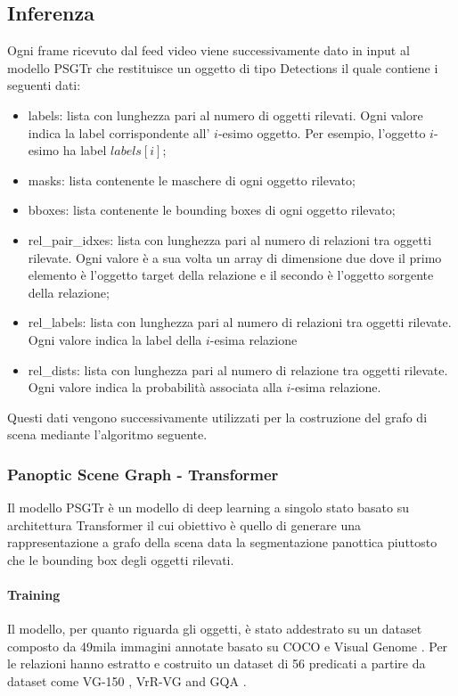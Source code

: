 \subsection{Inferenza}
Ogni frame ricevuto dal feed video viene successivamente dato in input al modello PSGTr \cite{yang2022psg} che restituisce un oggetto di tipo Detections il quale contiene i seguenti dati:
\begin{itemize}
  \item labels: lista con lunghezza pari al numero di oggetti rilevati. Ogni valore indica la label corrispondente all' $i$-esimo oggetto. Per esempio, l'oggetto $i$-esimo ha label $labels[i]$;
  \item masks: lista contenente le maschere di ogni oggetto rilevato;
  \item bboxes: lista contenente le bounding boxes di ogni oggetto rilevato;
  \item rel\_pair\_idxes: lista con lunghezza pari al numero di relazioni tra oggetti rilevate. Ogni valore è a sua volta un array di dimensione due dove il primo elemento è l'oggetto target della relazione e il secondo è l'oggetto sorgente della relazione;
  \item rel\_labels: lista con lunghezza pari al numero di relazioni tra oggetti rilevate. Ogni valore indica la label della $i$-esima relazione
  \item rel\_dists: lista con lunghezza pari al numero di relazione tra oggetti rilevate. Ogni valore indica la probabilità associata alla $i$-esima relazione.
\end{itemize}
Questi dati vengono successivamente utilizzati per la costruzione del grafo di scena mediante l'algoritmo seguente.

\subsubsection{Panoptic Scene Graph - Transformer}
Il modello PSGTr \cite{yang2022psg} è un modello di deep learning a singolo stato basato su architettura Transformer \cite{transformer} il cui obiettivo è quello di generare una rappresentazione a grafo della scena data la segmentazione panottica piuttosto che le bounding box degli oggetti rilevati.
\paragraph*{Training}
Il modello, per quanto riguarda gli oggetti, è stato addestrato su un dataset composto da 49mila immagini annotate basato su COCO \cite{coco} e Visual Genome \cite{visualgenemo}. Per le relazioni hanno estratto e costruito un dataset di 56 predicati a partire da dataset come VG-150 \cite{vg150}, VrR-VG \cite{vrvvg} and GQA \cite{cqa}.
